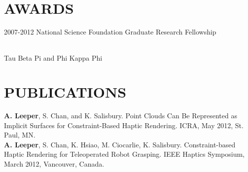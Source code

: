 \documentclass[line,margin]{res}
\newcommand{\CVOnly}[1]{}
\newcommand{\CVOnlySmall}[1]{{\small \CVOnly{#1}}}
\newcommand{\BothSmall}[1]{{\small #1}}   }
\newcommand{\CVOnly}[1]{#1}
\newcommand{\CVOnlySmall}[1]{{\CVOnly{#1}}}
\newcommand{\BothSmall}[1]{{#1}}    }
\newcommand{\boldName}[1]{\textbf{#1}}
\begin{document}
\begin{resume}
\section{AWARDS}
\vspace{1.0pc}	
          2007-2012 National Science Foundation Graduate Research Fellowship 
\CVOnly{\\[0.0pc]2007 Stanford Graduate Fellowship }
\\[0.0pc] Tau Beta Pi and Phi Kappa Phi


\section{PUBLICATIONS}
\vspace{1.2pc}
%
%
\CVOnlySmall{\boldName{A. Leeper}, K. Hsiao, M. Ciocarlie, I. Sucan, K. Salisbury. 
Constraint-Aware Teleoperation for Robots in Unstructured Environments. \textit{In submission}.\\[0.4pc]}
%
\CVOnlySmall{Chen, Tiffany., Ciocarlie, Matei., Cousins, Steve., Grice, Phillip M.., Hawkins, Kelsey., Hsiao, Kaijen., Kemp, Charlie., King, ChihHung., Lazewatsky, Daniel., \boldName{Leeper, Adam Eric.}, Nguyen, Hai., Paepcke, Andreas., Pantofaru, Caroline., Smart, William., and 
Takayama, Leila. 
Robots for humanity: using assistive robotics to empower people with disabilities.
IEEE Robotics and Automation Magazine 
special issue on Assistive Robotics. Volume 20, Issue 1, 2013. \\[0.4pc]}
%
\CVOnlySmall{A. Pratkanis, \boldName{A. Leeper}, K. Salisbury. Replacing the Office Intern: An Autonomous Coffee Run with a Mobile Manipulator. ICRA, May 2013, Karlsruhe, Germany. \\[0.4pc]}
%
\CVOnlySmall{M. Ciocarlie, K. Hsiao, \boldName{A. Leeper}, D. Gossow. Mobile Manipulation Through an Assistive Home Robot. IROS, October 2012, Algarve, Portugal. \\[0.4pc]}
%
\BothSmall{\boldName{A. Leeper}, S. Chan, and K. Salisbury. Point Clouds Can Be Represented as Implicit Surfaces for Constraint-Based Haptic Rendering. ICRA, May 2012, St. Paul, MN. \\[0.4pc]}
%
\BothSmall{\boldName{A. Leeper}, S. Chan, K. Hsiao, M. Ciocarlie, K. Salisbury. Constraint-based Haptic Rendering for Teleoperated Robot Grasping. IEEE Haptics Symposium, March 2012, Vancouver, Canada. \\[0.4pc]}

\end{resume}
\end{document}
